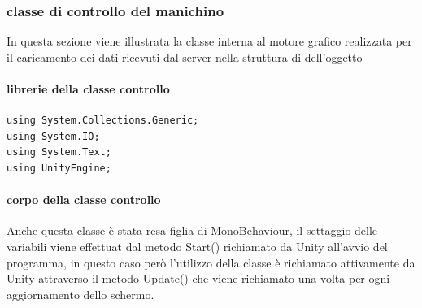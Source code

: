 \documentclass[10pt,a4paper]{article}
\begin{document}
\subsubsection{classe di controllo del manichino}
In questa sezione viene illustrata la classe interna al motore grafico realizzata per il caricamento dei dati ricevuti dal server nella struttura di dell'oggetto 
\paragraph{librerie della classe controllo}
\begin{lstlisting}[style=mycsharp, caption=Librerie classe controllo C\#, captionpos=b]
using System.Collections.Generic;
using System.IO;
using System.Text;
using UnityEngine; 
\end{lstlisting}
\paragraph{corpo della classe controllo}
Anche questa classe è stata resa figlia di MonoBehaviour, il settaggio delle variabili viene effettuat dal metodo Start() richiamato da Unity all'avvio del programma, in questo caso però l'utilizzo della classe è richiamato attivamente da Unity attraverso il metodo Update() che viene richiamato una volta per ogni aggiornamento dello schermo. 
\end{document}
